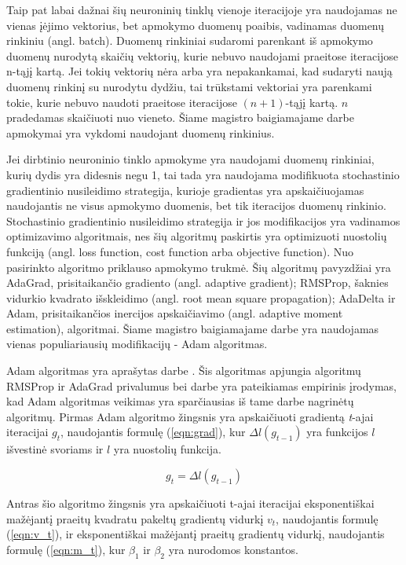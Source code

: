 Taip pat labai dažnai šių neuroninių tinklų vienoje iteracijoje yra naudojamas ne vienas įėjimo vektorius, bet apmokymo duomenų poaibis, vadinamas duomenų rinkiniu (angl. batch). Duomenų rinkiniai sudaromi parenkant iš apmokymo duomenų nurodytą skaičių vektorių, kurie nebuvo naudojami praeitose iteracijose n-tąjį kartą. Jei tokių vektorių nėra arba yra nepakankamai, kad sudaryti naują duomenų rinkinį su nurodytu dydžiu, tai trūkstami vektoriai yra parenkami tokie, kurie nebuvo naudoti praeitose iteracijose $(n + 1)$-tąjį kartą. $n$ pradedamas skaičiuoti nuo vieneto. Šiame magistro baigiamajame darbe apmokymai yra vykdomi naudojant duomenų rinkinius.

Jei dirbtinio neuroninio tinklo apmokyme yra naudojami duomenų rinkiniai, kurių dydis yra didesnis negu 1, tai tada yra naudojama modifikuota stochastinio gradientinio nusileidimo strategija, kurioje gradientas yra apskaičiuojamas naudojantis ne visus apmokymo duomenis, bet tik iteracijos duomenų rinkinio. Stochastinio gradientinio nusileidimo strategija ir jos modifikacijos yra vadinamos optimizavimo algoritmais, nes šių algoritmų paskirtis yra optimizuoti nuostolių funkciją (angl. loss function, cost function arba objective function). Nuo pasirinkto algoritmo priklauso apmokymo trukmė. Šių algoritmų pavyzdžiai yra AdaGrad, prisitaikančio gradiento (angl. adaptive gradient); RMSProp, šaknies vidurkio kvadrato išskleidimo (angl. root mean square propagation); AdaDelta ir Adam, prisitaikančios inercijos apskaičiavimo (angl. adaptive moment estimation), algoritmai. Šiame magistro baigiamajame darbe yra naudojamas vienas populiariausių modifikacijų - Adam algoritmas.

Adam algoritmas yra aprašytas darbe \cite{adam}. Šis algoritmas apjungia algoritmų RMSProp ir AdaGrad privalumus bei darbe \cite{adam} yra pateikiamas empirinis įrodymas, kad Adam algoritmas veikimas yra sparčiausias iš tame darbe nagrinėtų algoritmų. Pirmas Adam algoritmo žingsnis yra apskaičiuoti gradientą \textit{t}-ajai iteracijai $g_t$, naudojantis formulę (\ref{eqn:grad}), kur $\Delta l(g_{t-1})$ yra funkcijos $l$ išvestinė svoriams ir $l$ yra nuostolių funkcija.

\begin{equation}
\label{eqn:grad}
	g_t = \Delta l(g_{t-1})
\end{equation}

Antras šio algoritmo žingsnis yra apskaičiuoti t-ajai iteracijai eksponentiškai mažėjantį praeitų kvadratu pakeltų gradientų vidurkį $v_t$, naudojantis formulę (\ref{eqn:v_t}), ir eksponentiškai mažėjantį praeitų gradientų vidurkį, naudojantis formulę (\ref{eqn:m_t}), kur $\beta_1$ ir $\beta_2$ yra nurodomos konstantos.

